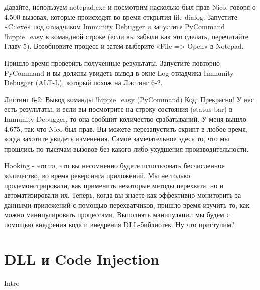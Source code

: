\documentclass[12pt, a4paper, oneside]{book}
\begin{document}
Давайте, используем notepad.exe и посмотрим насколько был прав Nico, говоря о 4.500 вызовах, которые происходят во время открытия file dialog. Запустите «C:\WINDOWS{}\notepad.exe» под отладчиком Immunity Debugger и запустите PyCommand !hippie\_easy в командной строке (если вы забыли как это сделать, перечитайте Главу 5). Возобновите процесс и затем выберите «File => Open» в Notepad.

Пришло время проверить полученные результаты. Запустите повторно PyCommand и вы должны увидеть вывод в окне Log отладчика Immunity Debugger (ALT-L), который похож на Листинг 6-2.

Листинг 6-2: Вывод команды !hippie\_easy (PyCommand)
Код:
Прекрасно! У нас есть результаты, и если вы посмотрите на строку состояния (status bar) в Immunity Debugger, то она сообщит количество срабатываний. У меня вышло 4.675, так что Nico был прав. Вы можете перезапустить скрипт в любое время, когда захотите увидеть изменения. Самое замечательное здесь то, что мы прошлись по тысячам вызовов без какого-либо ухудшения производительности. 

Hooking - это то, что вы несомненно будете использовать бесчисленное количество, во время реверсинга приложений. Мы не только продемонстрировали, как применить некоторые методы перехвата, но и автоматизировали их. Теперь, когда вы знаете как эффективно мониторить за данными приложений с помощью перехватчиков, пришло время изучить то, как можно манипулировать процессами. Выполнять манипуляции мы будем с помощью внедрения кода и внедрения DLL-библиотек. Ну что приступим? 

\chapter{DLL и Code Injection}
Intro
\end{document}
